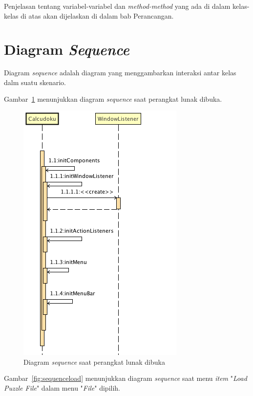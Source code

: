 Penjelasan tentang variabel-variabel dan \textit{method-method} yang ada di dalam kelas-kelas di atas akan dijelaskan di dalam bab Perancangan.

\section{Diagram \textit{Sequence}}
\label{sec:diagramsequence}

Diagram \textit{sequence} adalah diagram yang menggambarkan interaksi antar kelas dalm suatu skenario.

Gambar~\ref{fig:sequenceconstructor} menunjukkan diagram \textit{sequence} saat perangkat lunak dibuka.

\begin{figure}
\centering
\captionsetup{justification=centering}
\includegraphics[scale=0.5]{Gambar/Analisis/SequenceDiagramConstructor.png}
\caption[Diagram \textit{sequence} saat perangkat lunak dibuka]{Diagram \textit{sequence} saat perangkat lunak dibuka}
\label{fig:sequenceconstructor}
\end{figure}

Gambar~\ref{fig:sequenceload} menunjukkan diagram \textit{sequence} saat menu \textit{item} "\textit{Load Puzzle File}" dalam menu "\textit{File}" dipilih.

